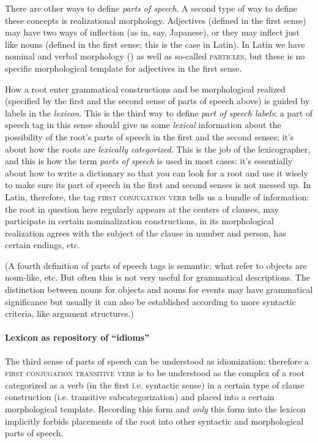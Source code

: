 \documentclass[a4paper, oneside, 12pt]{report}
\newcommand*{\term}[1]{\emph{#1}}
\newcommand*{\category}[1]{\textsc{#1}}
\begin{document}
There are other ways to define \term{parts of speech}.
A second type of way to define these concepts is realizational morphology.
Adjectives (defined in the first sense) may have two ways of inflection
(as in, say, Japanese),
or they may inflect just like nouns (defined in the first sense; this is the case in Latin).
In Latin we have nominal and verbal morphology ()
as well as so-called \category{particles},
but these is no specific morphological template for adjectives in the first sense.

How a root enter grammatical constructions and be morphological realized 
(specified by the first and the second sense of parts of speech above)
is guided by labels in the \emph{lexicon}.
This is the third way to define \term{part of speech labels}:
a part of speech tag in this sense should give us some \emph{lexical} information
about the possibility of the root's parts of speech in the first and the second senses;
it's about how the roots are \emph{lexically categorized}.
This is the job of the lexicographer,
and this is how the term \term{parts of speech} is used in most cases:
it's essentially about how to write a dictionary
so that you can look for a root and use it wisely to make sure 
its part of speech in the first and second senses is not messed up.
In Latin, therefore, the tag \category{first conjugation verb} tells us a bundle of information:
the root in question here regularly appears at the centers of clauses,
may participate in certain nominalization constructions,
in its morphological realization agrees with the subject of the clause in number and person,
has certain endings, etc.

(A fourth definition of parts of speech tags is semantic:
what refer to objects are noun-like, etc.
But often this is not very useful for grammatical descriptions.
The distinction between nouns for objects and nouns for events may have grammatical significance
but usually it can also be established according to more syntactic criteria,
like argument structures.)

\paragraph*{Lexicon as repository of ``idioms''}
The third sense of parts of speech can be understood as idiomization:
therefore a \category{first conjugation transitive verb}
is to be understood as the complex of a root categorized as a verb (in the first i.e. syntactic sense)
in a certain type of clause construction (i.e. transitive subcategorization)
and placed into a certain morphological template.
Recording this form and \emph{only} this form into the lexicon implicitly forbids
placements of the root into other syntactic and morphological parts of speech.
\end{document}
